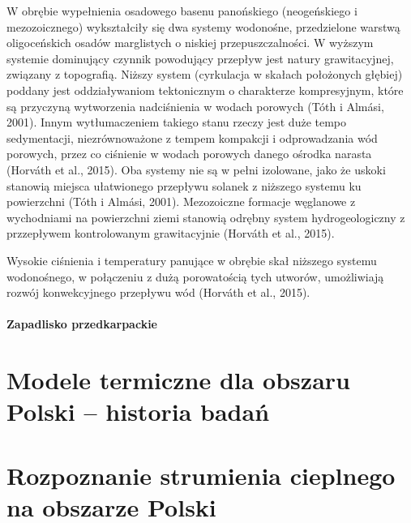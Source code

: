 \documentclass[11.5pt,twoside]{report}
\begin{document}
 W obrębie wypełnienia osadowego basenu panońskiego (neogeńskiego i mezozoicznego) wykształciły się dwa systemy wodonośne, przedzielone warstwą oligoceńskich osadów marglistych o niskiej przepuszczalności. W wyższym systemie dominujący czynnik powodujący przepływ jest natury grawitacyjnej, związany z topografią. Niższy system (cyrkulacja w skałach położonych głębiej) poddany jest oddziaływaniom tektonicznym o charakterze kompresyjnym, które są przyczyną wytworzenia nadciśnienia w wodach porowych (T\'{o}th i Alm\'{a}si, 2001). Innym wytłumaczeniem takiego stanu rzeczy jest duże tempo sedymentacji, niezrównoważone z tempem kompakcji i odprowadzania wód porowych, przez co ciśnienie w wodach porowych danego ośrodka narasta (Horv\'{a}th et al., 2015). Oba systemy nie są w pełni izolowane, jako że uskoki stanowią miejsca ułatwionego przepływu solanek z niższego systemu ku powierzchni (T\'{o}th i Alm\'{a}si, 2001). Mezozoiczne formacje węglanowe z wychodniami na powierzchni ziemi stanowią odrębny system hydrogeologiczny z przzepływem kontrolowanym grawitacyjnie (Horv\'{a}th et al., 2015). 
 
 Wysokie ciśnienia i temperatury panujące w obrębie skał niższego systemu wodonośnego, w połączeniu z dużą porowatością tych utworów, umożliwiają rozwój konwekcyjnego przepływu wód (Horv\'{a}th et al., 2015). 
 
 \subsubsection{Zapadlisko przedkarpackie}
 
 	\chapter{Modele termiczne dla obszaru Polski -- historia badań}
 
	\chapter{Rozpoznanie strumienia cieplnego na obszarze Polski}
 
 
 
\end{document}
